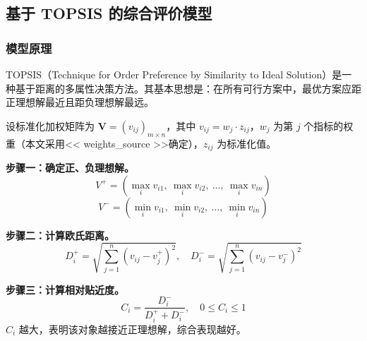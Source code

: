 
\subsection{基于 TOPSIS 的综合评价模型}

\subsubsection{模型原理}

TOPSIS（Technique for Order Preference by Similarity to Ideal Solution）是一种基于距离的多属性决策方法。其基本思想是：在所有可行方案中，最优方案应距正理想解最近且距负理想解最远。

设标准化加权矩阵为 $\mathbf{V} = (v_{ij})_{m \times n}$，其中 $v_{ij} = w_j \cdot z_{ij}$，$w_j$ 为第 $j$ 个指标的权重（本文采用<< weights_source >>确定），$z_{ij}$ 为标准化值。

\textbf{步骤一：确定正、负理想解。}
\begin{equation}
    V^+ = \left( \max_i v_{i1},\ \max_i v_{i2},\ \ldots,\ \max_i v_{in} \right)
    \label{eq:topsis_ideal_best}
\end{equation}
\begin{equation}
    V^- = \left( \min_i v_{i1},\ \min_i v_{i2},\ \ldots,\ \min_i v_{in} \right)
    \label{eq:topsis_ideal_worst}
\end{equation}

\textbf{步骤二：计算欧氏距离。}
\begin{equation}
    D_i^+ = \sqrt{\sum_{j=1}^{n} (v_{ij} - v_j^+)^2}, \quad
    D_i^- = \sqrt{\sum_{j=1}^{n} (v_{ij} - v_j^-)^2}
    \label{eq:topsis_distance}
\end{equation}

\textbf{步骤三：计算相对贴近度。}
\begin{equation}
    C_i = \frac{D_i^-}{D_i^+ + D_i^-}, \quad 0 \leq C_i \leq 1
    \label{eq:topsis_closeness}
\end{equation}
$C_i$ 越大，表明该对象越接近正理想解，综合表现越好。


